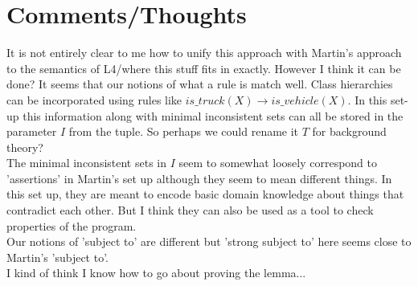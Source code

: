 \section{Comments/Thoughts}
It is not entirely clear to me how to unify this approach with Martin's approach to the semantics of L4/where this stuff fits in exactly. However I think it can be done? It seems that our notions of what a rule is match well. Class hierarchies can be incorporated using rules like $is\_truck(X)\rightarrow is\_vehicle(X)$. In this set-up this information along with minimal inconsistent sets can all be stored in the parameter $I$ from the tuple. So perhaps we could rename it $T$ for background theory?\\
\newline
The minimal inconsistent sets in $I$ seem to somewhat loosely correspond to 'assertions' in Martin's set up although they seem to mean different things. In this set up, they are meant to encode basic domain knowledge about things that contradict each other. But I think they can also be used as a tool to check properties of the program.\\
\newline
Our notions of 'subject to' are different but 'strong subject to' here seems close to Martin's 'subject to'.\\
\newline
I kind of think I know how to go about proving the lemma...
